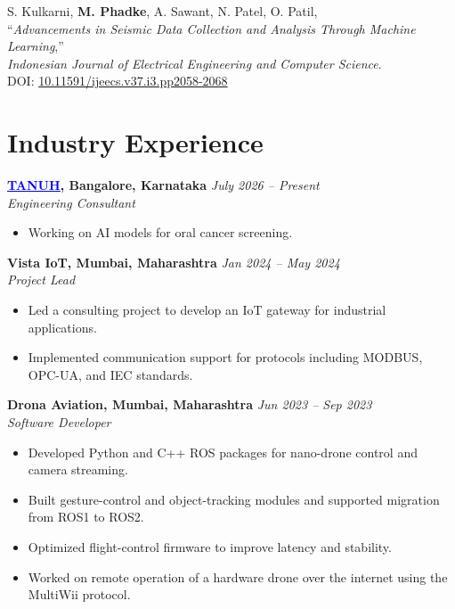 \documentclass[a4paper,10pt]{article}
\newcommand{\link}[2]{\href{#1}{\textcolor{blue}{\underline{#2}}}}
\begin{document}
\vspace{0.25em}
\noindent
[\textbf{J.1}] S. Kulkarni, \textbf{M. Phadke}, A. Sawant, N. Patel, O. Patil,\\
``\textit{Advancements in Seismic Data Collection and Analysis Through Machine Learning},''\\
\textit{Indonesian Journal of Electrical Engineering and Computer Science}.\\
DOI: \href{https://doi.org/10.11591/ijeecs.v37.i3.pp2058-2068}{10.11591/ijeecs.v37.i3.pp2058-2068}

\section*{Industry Experience}

\textbf{\link{https://www.tanuh.ai/}{TANUH}, Bangalore, Karnataka} \hfill \textit{July 2026 -- Present}\\
\textit{Engineering Consultant} \vspace{-0.4em}
\begin{itemize}
    \item Working on AI models for oral cancer screening.
\end{itemize}

\textbf{Vista IoT, Mumbai, Maharashtra} \hfill \textit{Jan 2024 -- May 2024}\\
\textit{Project Lead} \vspace{-0.4em}
\begin{itemize}
    \item Led a consulting project to develop an IoT gateway for industrial applications.
    \item Implemented communication support for protocols including MODBUS, OPC-UA, and IEC standards.
\end{itemize}

\textbf{Drona Aviation, Mumbai, Maharashtra} \hfill \textit{Jun 2023 -- Sep 2023}\\
\textit{Software Developer} \vspace{-0.4em}
\begin{itemize}
    \item Developed Python and C++ ROS packages for nano-drone control and camera streaming.
    \item Built gesture-control and object-tracking modules and supported migration from ROS1 to ROS2.
    \item Optimized flight-control firmware to improve latency and stability.
    \item Worked on remote operation of a hardware drone over the internet using the MultiWii protocol.
\end{itemize}
\end{document}
